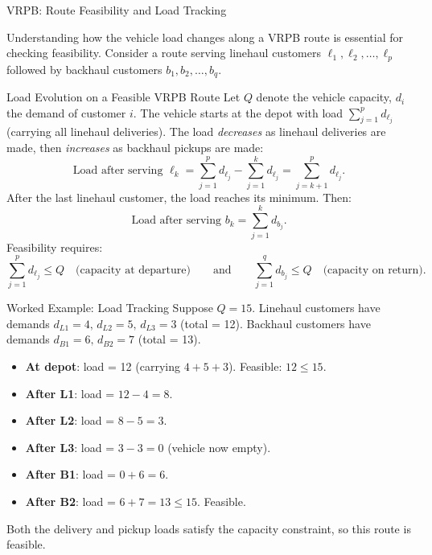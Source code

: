 \documentclass[aspectratio=169,10pt]{beamer}
\begin{document}
\begin{frame}[allowframebreaks]{VRPB: Route Feasibility and Load Tracking}

Understanding how the vehicle load changes along a VRPB route is essential
for checking feasibility.  Consider a route serving linehaul customers
$\ell_1, \ell_2, \ldots, \ell_p$ followed by backhaul customers
$b_1, b_2, \ldots, b_q$.

\begin{block}{Load Evolution on a Feasible VRPB Route}
  Let $Q$ denote the vehicle capacity, $d_i$ the demand of customer $i$.
  The vehicle starts at the depot with load $\sum_{j=1}^{p} d_{\ell_j}$
  (carrying all linehaul deliveries).  The load \emph{decreases} as linehaul
  deliveries are made, then \emph{increases} as backhaul pickups are made:
  \[
    \text{Load after serving } \ell_k = \sum_{j=1}^{p} d_{\ell_j}
                                        - \sum_{j=1}^{k} d_{\ell_j}
                                      = \sum_{j=k+1}^{p} d_{\ell_j}.
  \]
  After the last linehaul customer, the load reaches its minimum.  Then:
  \[
    \text{Load after serving } b_k = \sum_{j=1}^{k} d_{b_j}.
  \]
  Feasibility requires:
  \[
    \sum_{j=1}^{p} d_{\ell_j} \leq Q \quad \text{(capacity at departure)}
    \qquad \text{and} \qquad
    \sum_{j=1}^{q} d_{b_j} \leq Q \quad \text{(capacity on return)}.
  \]
\end{block}

\begin{exampleblock}{Worked Example: Load Tracking}
  Suppose $Q = 15$.  Linehaul customers have demands $d_{L1}=4,\, d_{L2}=5,\,
  d_{L3}=3$ (total = 12).  Backhaul customers have demands $d_{B1}=6,\,
  d_{B2}=7$ (total = 13).
  \begin{itemize}
    \item \textbf{At depot}: load = 12 (carrying $4+5+3$). Feasible: $12 \leq 15$.
    \item \textbf{After L1}: load = $12 - 4 = 8$.
    \item \textbf{After L2}: load = $8 - 5 = 3$.
    \item \textbf{After L3}: load = $3 - 3 = 0$ (vehicle now empty).
    \item \textbf{After B1}: load = $0 + 6 = 6$.
    \item \textbf{After B2}: load = $6 + 7 = 13 \leq 15$. Feasible.
  \end{itemize}
  Both the delivery and pickup loads satisfy the capacity constraint, so this
  route is feasible.
\end{exampleblock}

\end{frame}
\end{document}
